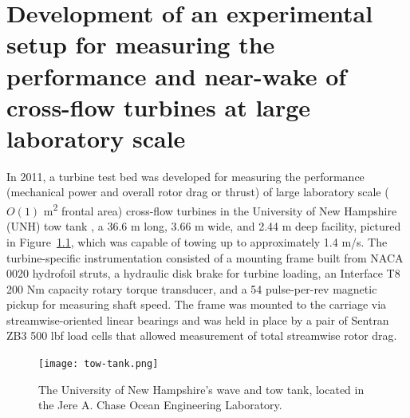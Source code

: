 \chapter{Development of an experimental setup for measuring the performance and
    near-wake of cross-flow turbines at large laboratory
    scale}\label{chap:exp-setup}

In 2011, a turbine test bed was developed for measuring the performance
(mechanical power and overall rotor drag or thrust) of large laboratory scale
($O(1)$ m\textsuperscript{2} frontal area) cross-flow turbines in the University
of New Hampshire (UNH) tow tank \cite{Bachant2011-MS}, a 36.6 m long, 3.66 m
wide, and 2.44 m deep facility, pictured in Figure~\ref{fig:tow-tank}, which was
capable of towing up to approximately 1.4 m/s. The turbine-specific
instrumentation consisted of a mounting frame built from NACA 0020 hydrofoil
struts, a hydraulic disk brake for turbine loading, an Interface T8 200 Nm
capacity rotary torque transducer, and a 54 pulse-per-rev magnetic pickup for
measuring shaft speed. The frame was mounted to the carriage via
streamwise-oriented linear bearings and was held in place by a pair of Sentran
ZB3 500 lbf load cells that allowed measurement of total streamwise rotor drag.

\begin{figure}
    \centering

    \texttt{[image: tow-tank.png]}

    \caption{The University of New Hampshire's wave and tow tank, located in the
        Jere A. Chase Ocean Engineering Laboratory.}

    \label{fig:tow-tank}
\end{figure}

